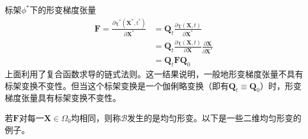 \documentclass[main.tex]{subfiles}
\begin{document}
标架$\phi^*$下的形变梯度张量
\begin{align*}
    \mathbf{F}=\frac{\partial \chi^*\left(\mathbf{X}^*,t^*\right)}{\partial \mathbf{X}^*}&=\mathbf{Q}_t\frac{\partial\chi\left(\mathbf{X},t\right)}{\partial\mathbf{X}^*}\\
    &=\mathbf{Q}_t\frac{\partial\chi\left(\mathbf{X},t\right)}{\partial \mathbf{X}}\frac{\partial\mathbf{X}}{\partial\mathbf{X}^*}\\
    &=\mathbf{Q}_t\mathbf{F}\mathbf{Q}_0
\end{align*}
上面利用了复合函数求导的链式法则。这一结果说明，一般地形变梯度张量不具有标架变换不变性。但当这个标架变换是一个伽俐略变换（即有$\mathbf{Q}_t\equiv\mathbf{Q}_0$）时，形变梯度张量具有标架变换不变性。

若$\mathbf{F}$对每一$\mathbf{X}\in\Omega_0$均相同，则称$\mathcal{B}$发生的是均匀形变。以下是一些二维均匀形变的例子。
\end{document}
